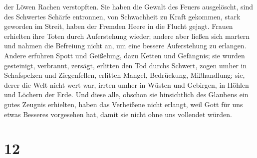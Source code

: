 der Löwen Rachen verstopften.  Sie haben die Gewalt des
Feuers ausgelöscht, sind des Schwertes Schärfe entronnen, von
Schwachheit zu Kraft gekommen, stark geworden im Streit, haben der
Fremden Heere in die Flucht gejagt.  Frauen erhielten
ihre Toten durch Auferstehung wieder; andere aber ließen sich martern
und nahmen die Befreiung nicht an, um eine bessere Auferstehung zu
erlangen.  Andere erfuhren Spott und Geißelung, dazu
Ketten und Gefängnis;  sie wurden gesteinigt, verbrannt,
zersägt, erlitten den Tod durchs Schwert, zogen umher in Schafspelzen
und Ziegenfellen, erlitten Mangel, Bedrückung, Mißhandlung;
 sie, derer die Welt nicht wert war, irrten umher in
Wüsten und Gebirgen, in Höhlen und Löchern der Erde.  Und
diese alle, obschon sie hinsichtlich des Glaubens ein gutes Zeugnis
erhielten, haben das Verheißene nicht erlangt,  weil Gott
für uns etwas Besseres vorgesehen hat, damit sie nicht ohne uns
vollendet würden.

\hypertarget{section-11}{%
\section{12}\label{section-11}}

